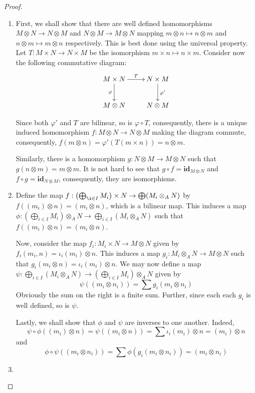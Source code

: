 \begin{proof}
\begin{enumerate}[label=(\alph*)]
\item First, we shall show that there are well defined homomorphisms $M\otimes N\to N\otimes M$ and $N\otimes M\to M\otimes N$ mapping $m\otimes n\mapsto n\otimes m$ and $n\otimes m\mapsto m\otimes n$ respectively. This is best done using the universal property. Let $T: M\times N\to N\times M$ be the isomorphism $m\times n\mapsto n\times m$. Consider now the following commutative diagram: 
\begin{equation*}
\xymatrix{
    M\times N\ar[d]_\varphi\ar[r]^-T & N\times M\ar[d]^{\varphi'}\\
    M\otimes N & N\otimes M
}
\end{equation*}

Since both $\varphi'$ and $T$ are bilinear, so is $\varphi\circ T$, consequently, there is a unique induced homomorphism $f: M\otimes N\to N\otimes M$ making the diagram commute, consequently, $f(m\otimes n) = \varphi'(T(m\times n)) = n\otimes m$.

Similarly, there is a homomorphism $g: N\otimes M\to M\otimes N$ such that $g(n\otimes m) = m\otimes m$. It is not hard to see that $g\circ f = \mathbf{id}_{M\otimes N}$ and $f\circ g = \mathbf{id}_{N\otimes M}$, consequently, they are isomorphisms.

\item Define the map $f:\left(\bigoplus_{\i\in I}M_i\right)\times N\to\bigoplus(M_i\otimes_A N)$ by $f((m_i)\otimes n) = (m_i\otimes n)$, which is a bilinear map. This induces a map $\phi:\left(\bigoplus_{i\in I}M_i\right)\otimes_A N\to\bigoplus_{i\in I}(M_i\otimes_A N)$ such that $f((m_i)\otimes n) = (m_i\otimes n)$. 

Now, consider the map $f_i: M_i\times N\to M\otimes N$ given by $f_i(m_i, n) = \iota_i(m_i)\otimes n$. This induces a map $g_i: M_i\otimes_A N\to M\otimes N$ such that $g_i(m_i\otimes n) = \iota_i(m_i)\otimes n$. We may now define a map $\psi:\bigoplus_{i\in I} (M_i\otimes_A N)\to\left(\bigoplus_{i\in I}M_i\right)\otimes_A N$ given by 
\begin{equation*}
    \psi((m_i\otimes n_i)) = \sum g_i(m_i\otimes n_i)
\end{equation*}
Obviously the sum on the right is a finite sum. Further, since each each $g_i$ is well defined, so is $\psi$. 

Lastly, we shall show that $\phi$ and $\psi$ are inverses to one another. Indeed, 
\begin{equation*}
    \psi\circ\phi((m_i)\otimes n) = \psi((m_i\otimes n)) = \sum \iota_i(m_i)\otimes n = (m_i)\otimes n
\end{equation*}
and 
\begin{equation*}
    \phi\circ\psi((m_i\otimes n_i)) = \sum\phi(g_i(m_i\otimes n_i)) = (m_i\otimes n_i)
\end{equation*}
\item


\end{enumerate}
\end{proof}

